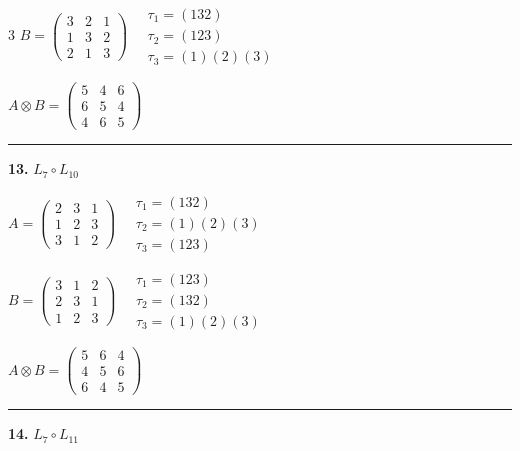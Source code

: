 \begin{multicols}{3}
$B = \begin{pmatrix} 3 & 2 & 1 \\ 1 & 3 & 2 \\ 2 & 1 & 3 \end{pmatrix} \quad \begin{matrix} \tau_{1}=(1 3 2) \\ \tau_{2}=(1 2 3) \\ \tau_{3}=(1)(2)(3) \end{matrix}$

$A \otimes B = \begin{pmatrix} 5 & 4 & 6 \\ 6 & 5 & 4 \\ 4 & 6 & 5 \end{pmatrix}$

\vspace{0.3em}
\hrule
\vspace{0.3em}

\noindent\textbf{13.} $L_{7} \circ L_{10}$

$A = \begin{pmatrix} 2 & 3 & 1 \\ 1 & 2 & 3 \\ 3 & 1 & 2 \end{pmatrix} \quad \begin{matrix} \tau_{1}=(1 3 2) \\ \tau_{2}=(1)(2)(3) \\ \tau_{3}=(1 2 3) \end{matrix}$

$B = \begin{pmatrix} 3 & 1 & 2 \\ 2 & 3 & 1 \\ 1 & 2 & 3 \end{pmatrix} \quad \begin{matrix} \tau_{1}=(1 2 3) \\ \tau_{2}=(1 3 2) \\ \tau_{3}=(1)(2)(3) \end{matrix}$

$A \otimes B = \begin{pmatrix} 5 & 6 & 4 \\ 4 & 5 & 6 \\ 6 & 4 & 5 \end{pmatrix}$

\vspace{0.3em}
\hrule
\vspace{0.3em}

\noindent\textbf{14.} $L_{7} \circ L_{11}$


\end{multicols}
